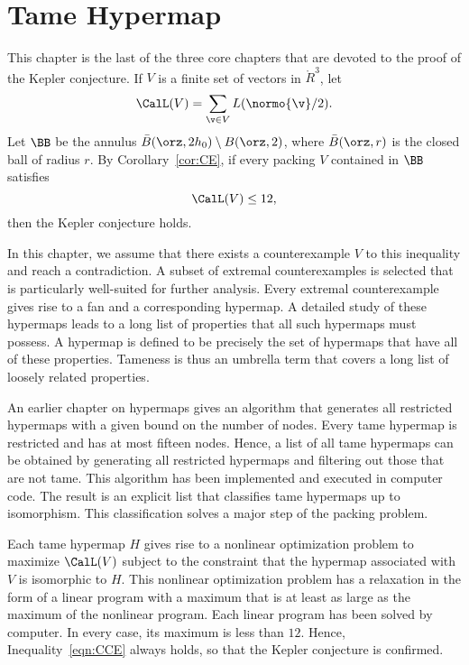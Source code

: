 

\chapter{Tame Hypermap}
%

\label{sec:tame}
%

\begin{summary}
  This chapter is the last of the three core chapters that are devoted
  to the proof of the Kepler conjecture.  If $V$ is a finite set of
  vectors in $\ring{R}^3$, let
  \[ \CalL(V) = \sum_{\v\in V}
    L(\normo{\v}/2).\] 
Let $\BB$ be the
annulus $\bar B(\orz,2h_0)\setminus B(\orz,2)$, where
$\bar B(\orz,r)$ is the closed ball of radius $r$.
By Corollary~\ref{cor:CE}, if every packing $V$
contained in $\BB$
satisfies
\begin{equation}\label{eqn:CCE}
\CalL(V) \le 12,
\end{equation}
then the Kepler conjecture holds.
%

In this chapter, we assume that there exists a counterexample $V$ to this
inequality and reach a contradiction.  A subset of extremal
counterexamples  is selected that is particularly well-suited for
further analysis.  Every extremal counterexample gives rise to a fan
and a corresponding hypermap.  A detailed study of these hypermaps
leads to a long list of properties that all such hypermaps must
possess.  A  hypermap is defined to be precisely the set
of hypermaps that have all of these properties.  Tameness is thus an
umbrella term that covers a long list of loosely related properties.

An earlier chapter on hypermaps gives an algorithm that generates all
restricted hypermaps with a given bound on the number of nodes.
Every tame hypermap is restricted and has at most fifteen nodes.  Hence, a
list of all tame hypermaps can be obtained by generating all
restricted hypermaps and filtering out those that are not tame.  This
algorithm has been implemented and executed in computer code.  The result
 is an explicit list that classifies tame hypermaps
up to isomorphism.  This classification solves a major step of the
packing problem.

Each tame hypermap $H$ gives rise to a nonlinear optimization problem to
maximize $\CalL(V)$ subject to the constraint that the hypermap
associated with $V$ is isomorphic to $H$.  This nonlinear optimization
problem has a relaxation in the form of a linear program with a maximum that
 is at least as large as the maximum of the nonlinear program.
Each linear program has been solved by computer.  In every case, its
maximum is less than $12$.  Hence, Inequality~\ref{eqn:CCE}
always holds, so that the Kepler conjecture is confirmed.
\end{summary}
%
%



